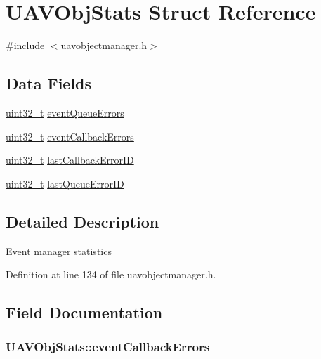 \hypertarget{struct_u_a_v_obj_stats}{\section{U\-A\-V\-Obj\-Stats Struct Reference}
\label{struct_u_a_v_obj_stats}
}


{\ttfamily \#include $<$uavobjectmanager.\-h$>$}

\subsection*{Data Fields}
\begin{DoxyCompactItemize}
\item 
\hyperlink{stdint_8h_a435d1572bf3f880d55459d9805097f62}{uint32\-\_\-t} \hyperlink{struct_u_a_v_obj_stats_a0dc695f48120e441e86ad99fe656627a}{event\-Queue\-Errors}
\item 
\hyperlink{stdint_8h_a435d1572bf3f880d55459d9805097f62}{uint32\-\_\-t} \hyperlink{struct_u_a_v_obj_stats_a089a0df0362c3cb4e7cd4c61005ac105}{event\-Callback\-Errors}
\item 
\hyperlink{stdint_8h_a435d1572bf3f880d55459d9805097f62}{uint32\-\_\-t} \hyperlink{struct_u_a_v_obj_stats_ac3961ffa474982b4c8678fcfd240476f}{last\-Callback\-Error\-I\-D}
\item 
\hyperlink{stdint_8h_a435d1572bf3f880d55459d9805097f62}{uint32\-\_\-t} \hyperlink{struct_u_a_v_obj_stats_a7ad7134bdc6a7f7807b8387a71f507a0}{last\-Queue\-Error\-I\-D}
\end{DoxyCompactItemize}


\subsection{Detailed Description}
Event manager statistics 

Definition at line 134 of file uavobjectmanager.\-h.



\subsection{Field Documentation}
\hypertarget{struct_u_a_v_obj_stats_a089a0df0362c3cb4e7cd4c61005ac105}{
\subsubsection[{event\-Callback\-Errors}]{ U\-A\-V\-Obj\-Stats\-::event\-Callback\-Errors}}\label{struct_u_a_v_obj_stats_a089a0df0362c3cb4e7cd4c61005ac105}


